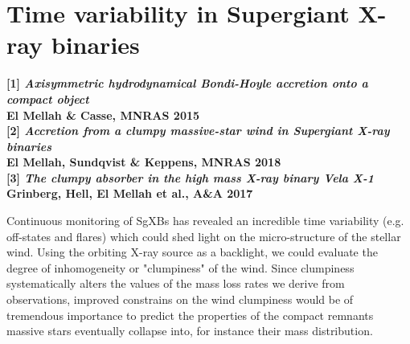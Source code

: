 \documentclass[11pt,onecolumn]{article}
\makeatletter
\newcommand{\sgx}{SgXB\xspace}
\newcommand{\sgxs}{SgXBs\xspace}
\newcommand*{\hmxb}{HMXB\@\xspace}
\newcommand*{\eg}{e.g.\@\xspace}
\makeatother
\begin{document}

\section*{Time variability in Supergiant X-ray binaries}
\label{sec:summary}

\footnotesize
\textbf{[1] \textit{Axisymmetric hydrodynamical Bondi-Hoyle accretion onto a compact object}}\\
\hspace*{16pt}\textbf{El Mellah \& Casse, MNRAS 2015}\\
\textbf{[2] \textit{Accretion from a clumpy massive-star wind in Supergiant X-ray binaries}}\\
\hspace*{16pt}\textbf{El Mellah, Sundqvist \& Keppens, MNRAS 2018}\\
\textbf{[3] \textit{The clumpy absorber in the high mass X-ray binary Vela X-1}}\\
\hspace*{16pt}\textbf{Grinberg, Hell, El Mellah et al., A\&A 2017}\\

\normalsize


Continuous monitoring of \sgxs has revealed an incredible time variability (\eg off-states and flares) which could shed light on the micro-structure of the stellar wind. Using the orbiting X-ray source as a backlight, we could evaluate the degree of inhomogeneity or "clumpiness" of the wind. Since clumpiness systematically alters the values of the mass loss rates we derive from observations, improved constrains on the wind clumpiness would be of tremendous importance to predict the properties of the compact remnants massive stars eventually collapse into, for instance their mass distribution.
\end{document}
